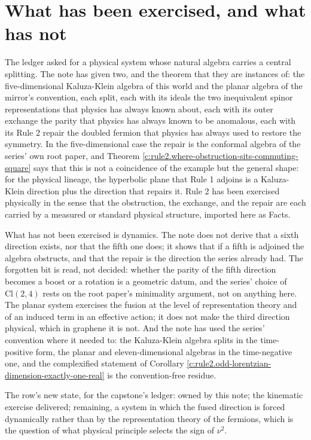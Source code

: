 \documentclass[11pt]{article}
\theoremstyle{definition}
\theoremstyle{plain}
\providecommand{\Cl}{}\renewcommand{\Cl}{\mathrm{Cl}}
\begin{document}
\section{What has been exercised, and what has not}

\label{c:note.rule2.setting-what-has-been-exercised-what}
The ledger asked for a physical system whose natural algebra carries a central splitting. The note has given two, and the theorem that they are instances of: the five-dimensional Kaluza-Klein algebra of this world and the planar algebra of the mirror's convention, each split, each with its ideals the two inequivalent spinor representations that physics has always known about, each with its outer exchange the parity that physics has always known to be anomalous, each with its Rule 2 repair the doubled fermion that physics has always used to restore the symmetry. In the five-dimensional case the repair is the conformal algebra of the series' own root paper, and Theorem \ref{c:rule2.where-obstruction-sits-commuting-square} says that this is not a coincidence of the example but the general shape: for the physical lineage, the hyperbolic plane that Rule 1 adjoins is a Kaluza-Klein direction plus the direction that repairs it. Rule 2 has been exercised physically in the sense that the obstruction, the exchange, and the repair are each carried by a measured or standard physical structure, imported here as Facts.

What has not been exercised is dynamics. The note does not derive that a sixth direction exists, nor that the fifth one does; it shows that if a fifth is adjoined the algebra obstructs, and that the repair is the direction the series already had. The forgotten bit is read, not decided: whether the parity of the fifth direction becomes a boost or a rotation is a geometric datum, and the series' choice of $\Cl(2,4)$ rests on the root paper's minimality argument, not on anything here. The planar system exercises the fusion at the level of representation theory and of an induced term in an effective action; it does not make the third direction physical, which in graphene it is not. And the note has used the series' convention where it needed to: the Kaluza-Klein algebra splits in the time-positive form, the planar and eleven-dimensional algebras in the time-negative one, and the complexified statement of Corollary \ref{c:rule2.odd-lorentzian-dimension-exactly-one-real} is the convention-free residue.

The row's new state, for the capstone's ledger: owned by this note; the kinematic exercise delivered; remaining, a system in which the fused direction is forced dynamically rather than by the representation theory of the fermions, which is the question of what physical principle selects the sign of $\nu^2$.
\end{document}
